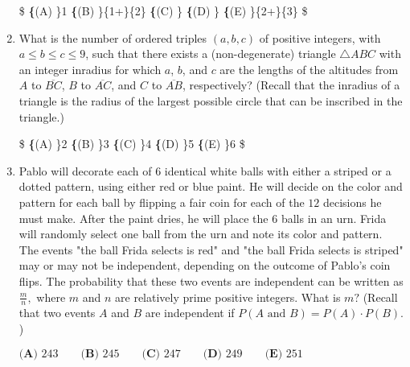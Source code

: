 \documentclass{article}
\begin{document}
\begin{enumerate}[label=\arabic*., itemsep=0.5em]
\$
\textbf\{(A) \}1 \qquad
\textbf\{(B) \}\frac\{1+\}\{2\} \qquad
\textbf\{(C) \} \qquad
\textbf\{(D) \} \qquad
\textbf\{(E) \}\frac\{2+\}\{3\} \qquad
\$\par \vspace{0.5em}\item What is the number of ordered triples $(a,b,c)$ of positive integers, with $a\le b\le c\le 9$, such that there exists a (non-degenerate) triangle $\triangle ABC$ with an integer inradius for which $a$, $b$, and $c$ are the lengths of the altitudes from $A$ to $\overline{BC}$, $B$ to $\overline{AC}$, and $C$ to $\overline{AB}$, respectively? (Recall that the inradius of a triangle is the radius of the largest possible circle that can be inscribed in the triangle.)

\$
\textbf\{(A) \}2\qquad
\textbf\{(B) \}3\qquad
\textbf\{(C) \}4\qquad
\textbf\{(D) \}5\qquad
\textbf\{(E) \}6\qquad
\$\par \vspace{0.5em}\item Pablo will decorate each of $6$ identical white balls with either a striped or a dotted pattern, using either red or blue paint. He will decide on the color and pattern for each ball by flipping a fair coin for each of the $12$ decisions he must make. After the paint dries, he will place the $6$ balls in an urn. Frida will randomly select one ball from the urn and note its color and pattern. The events "the ball Frida selects is red" and "the ball Frida selects is striped" may or may not be independent, depending on the outcome of Pablo's coin flips. The probability that these two events are independent can be written as $\frac mn,$ where $m$ and $n$ are relatively prime positive integers. What is $m?$ (Recall that two events $A$ and $B$ are independent if $P(A \text{ and }B) = P(A) \cdot P(B).$)

$\textbf{(A) } 243 \qquad \textbf{(B) } 245 \qquad \textbf{(C) } 247 \qquad \textbf{(D) } 249\qquad \textbf{(E) } 251$\par \vspace{0.5em}\end{enumerate}
\end{document}
